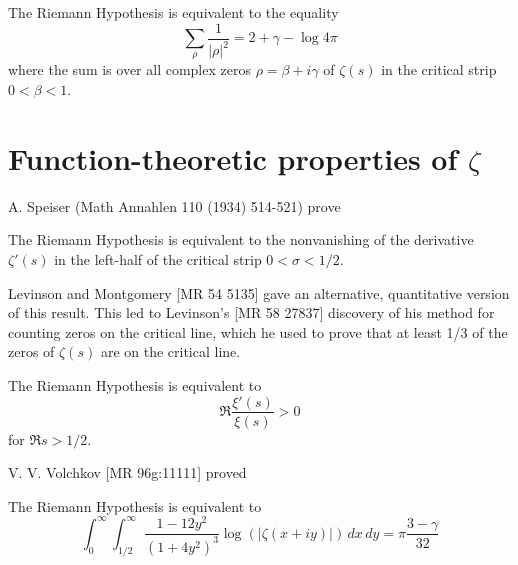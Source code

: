 \documentclass[12pt,letterpaper, reqno]{aimpl}
\begin{document}
\begin{problemblock}
\begin{rhequivalence}[5.3]
The Riemann Hypothesis is equivalent to the equality
$$ \sum_{\rho} \frac{1}{|\rho|^2} = 2+\gamma-\log 4\pi
$$
where the sum is over all complex zeros $\rho=\beta+i\gamma$ of $\zeta(s)$ in the critical strip $0<\beta<1$.
\end{rhequivalence}
\end{problemblock}


\section{Function-theoretic properties of $\zeta$ }

\begin{problemblock}
A. Speiser (Math Annahlen 110 (1934) 514-521) prove
\begin{rhequivalence}[6.1]The Riemann Hypothesis is
equivalent to
the nonvanishing of the derivative $\zeta'(s)$ in the
left-half of the critical strip $0<\sigma< 1/2$.
\end{rhequivalence}

\begin{remark} Levinson and Montgomery [MR 54 5135]
gave an alternative, quantitative version of this result.
This led to Levinson's
[MR 58 27837] discovery of his method for counting zeros on the critical
line,  which he used to prove that at least 1/3 of the zeros of
$\zeta(s)$ are on the critical line.
\end{remark}

\end{problemblock}

\begin{problemblock}

\begin{rhequivalence}[6.2]The Riemann Hypothesis is
equivalent to
$$\Re \frac{\xi'(s)}{\xi(s)}>0$$
for $\Re s>1/2$.
\end{rhequivalence}

\end{problemblock}

\begin{problemblock}

V. V. Volchkov [MR 96g:11111] proved
\begin{rhequivalence}[6.3]The Riemann Hypothesis is
equivalent to
$$
\int_0^\infty \int_{1/2}^\infty
 \frac{1-12y^2}{(1+4 y^2)^3}\log(|\zeta(x+iy)|)\, dx \, dy
=\pi\frac{3-\gamma}{32}
$$
\end{rhequivalence}
\end{problemblock}
\end{document}

